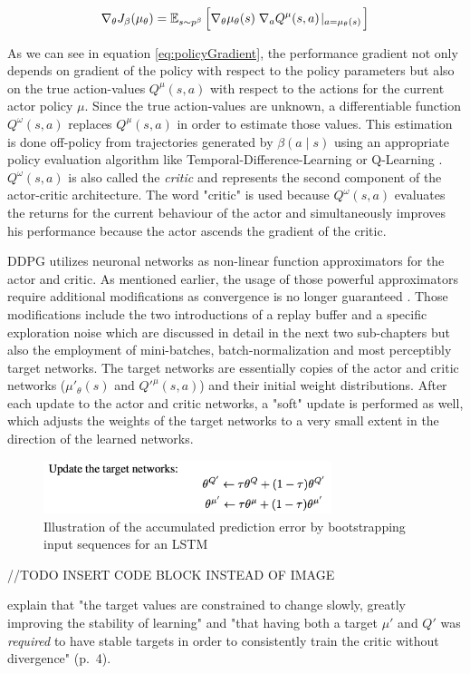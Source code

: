 \begin{equation}\label{eq:policyGradient}
    \nabla_\theta J_\beta (\mu_\theta) = 
    \operatorname{\mathbb{E}}_{s \sim p^\beta}
    \Big[ \nabla_\theta \mu_\theta(s) \; \nabla_a Q^\mu (s,a) \!\mid_{a = \mu_\theta (s)} \! \Big]
\end{equation}


As we can see in equation \ref{eq:policyGradient}, the performance gradient not only depends on gradient of the policy with respect to the policy parameters but also on the true action-values $Q^\mu(s,a)$ with respect to the actions for the current actor policy $\mu$. Since the true action-values are unknown, a differentiable function $Q^ \omega(s,a)$ replaces $Q^\mu(s,a)$ in order to estimate those values. This estimation is done off-policy from trajectories generated by $\beta(a\!\mid\!s)$ using an appropriate policy evaluation algorithm like Temporal-Difference-Learning or Q-Learning \cite[p.~5]{silver2014deterministic}. $Q^ \omega(s,a)$ is also called the \textit{critic} and represents the second component of the actor-critic architecture. The word "critic" is used because $Q^ \omega(s,a)$ evaluates the returns for the current behaviour of the actor and simultaneously improves his performance because the actor ascends the gradient of the critic.
\par
DDPG utilizes neuronal networks as non-linear function approximators for the actor and critic. As mentioned earlier, the usage of those powerful approximators require additional modifications as convergence is no longer guaranteed \cite[p.3]{lillicrap2019continuous}. Those modifications include the two introductions of a replay buffer and a specific exploration noise which are discussed in detail in the next two sub-chapters but also the employment of mini-batches, batch-normalization and most perceptibly target networks. The target networks are essentially copies of the actor and critic networks ($\mu'_\theta(s)$ and $Q'^\mu(s,a)$) and their initial weight distributions. After each update to the actor and critic networks, a "soft" update is performed as well, which adjusts the weights of the target networks to a very small extent in the direction of the learned networks.
\begin{figure}[H]
    \centering
    \includegraphics[width=0.75\textwidth]{images/ddpg_code/update_target.png}
    \caption{Illustration of the accumulated prediction error by bootstrapping input sequences for an LSTM}
    \label{fig:lstm}
\end{figure}
//TODO INSERT CODE BLOCK INSTEAD OF IMAGE \par

\cite{lillicrap2019continuous} explain that "the target values are constrained to change slowly, greatly improving the stability of learning" and "that having both a target $\mu'$ and $Q'$ was \textit{required} to have stable targets in order to consistently train the critic without divergence" (p.~4).
